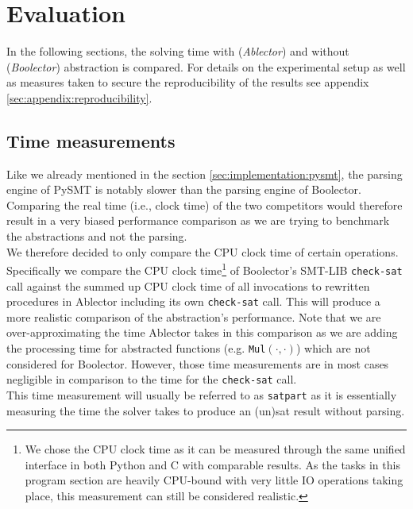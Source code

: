 \chapter{Evaluation}
\label{ch:evaluation}
In the following sections, the solving time with (\textit{Ablector}) and without (\textit{Boolector}) abstraction is compared.
For details on the experimental setup as well as measures taken to secure the reproducibility of the results see appendix \ref{sec:appendix:reproducibility}.

\section{Time measurements}
Like we already mentioned in the section \ref{sec:implementation:pysmt}, the parsing engine of PySMT is notably slower than the parsing engine of Boolector.
Comparing the real time (i.e., clock time) of the two competitors would therefore result in a very biased performance comparison as we are trying
to benchmark the abstractions and not the parsing.\\
We therefore decided to only compare the CPU clock time of certain operations.
Specifically we compare the CPU clock time\footnote{We chose the CPU clock time as it can be measured through the same unified interface in both Python and C with comparable results. As the tasks in this program section are heavily CPU-bound with very little IO operations taking place, this measurement can still be considered realistic.} of Boolector's SMT-LIB \texttt{check-sat} call
against the summed up CPU clock time of all invocations to rewritten procedures in Ablector including its own \texttt{check-sat} call.
This will produce a more realistic comparison of the abstraction's performance.
Note that we are over-approximating the time Ablector takes in this comparison as we are
adding the processing time for abstracted functions (e.g. \texttt{Mul$\left(\cdot,\cdot\right)$}) which are not considered for Boolector.
However, those time measurements are in most cases negligible in comparison to the time for the \texttt{check-sat} call.\\
This time measurement will usually be referred to as \texttt{satpart} as it is essentially measuring the time the solver takes to produce an (un)sat result without parsing.

